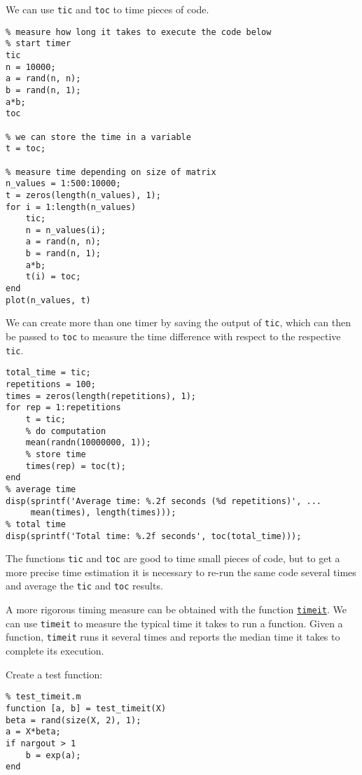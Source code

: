\documentclass[12pt, a4paper]{article}
\begin{document}
We can use \texttt{tic} and \texttt{toc} to time pieces of code.
\lstset{language=matlab,label= ,caption= ,captionpos=b,firstnumber=1,numbers=left,style=Matlab-editor}
\begin{lstlisting}
% measure how long it takes to execute the code below
% start timer
tic
n = 10000;
a = rand(n, n);
b = rand(n, 1);
a*b;
toc

% we can store the time in a variable
t = toc;

% measure time depending on size of matrix
n_values = 1:500:10000;
t = zeros(length(n_values), 1);
for i = 1:length(n_values)
    tic;
    n = n_values(i);
    a = rand(n, n);
    b = rand(n, 1);
    a*b;
    t(i) = toc;
end
plot(n_values, t)
\end{lstlisting}
We can create more than one timer by saving the output of \texttt{tic}, which can then be passed to \texttt{toc} to measure the time difference with respect to the respective \texttt{tic}.
\lstset{language=matlab,label= ,caption= ,captionpos=b,firstnumber=1,numbers=left,style=Matlab-editor}
\begin{lstlisting}
total_time = tic;
repetitions = 100;
times = zeros(length(repetitions), 1);
for rep = 1:repetitions
    t = tic;
    % do computation
    mean(randn(10000000, 1));
    % store time
    times(rep) = toc(t);
end
% average time
disp(sprintf('Average time: %.2f seconds (%d repetitions)', ...
     mean(times), length(times)));
% total time
disp(sprintf('Total time: %.2f seconds', toc(total_time)));
\end{lstlisting}
The functions \texttt{tic} and \texttt{toc} are good to time small pieces of code, but to get a more precise time estimation it is necessary to re-run the same code several times and average the \texttt{tic} and \texttt{toc} results.

A more rigorous timing measure can be obtained with the function \href{https://www.mathworks.com/help/matlab/ref/timeit.html}{\texttt{timeit}}.
We can use \texttt{timeit} to measure the typical time it takes to run a function.
Given a function, \texttt{timeit} runs it several times and reports the median time it takes to complete its execution.

Create a test function:
\lstset{language=matlab,label= ,caption= ,captionpos=b,firstnumber=1,numbers=left,style=Matlab-editor}
\begin{lstlisting}
% test_timeit.m
function [a, b] = test_timeit(X)
beta = rand(size(X, 2), 1);
a = X*beta;
if nargout > 1
    b = exp(a);
end
\end{lstlisting}
\end{document}
